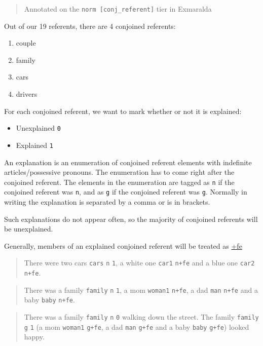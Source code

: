\documentclass[
]{book}
\providecommand{\tightlist}{%
  \setlength{\itemsep}{0pt}\setlength{\parskip}{0pt}}
\begin{document}
\begin{quote}
Annotated on the \texttt{norm\ {[}conj\_referent{]}} tier in Exmaralda
\end{quote}

Out of our 19 referents, there are 4 conjoined referents:

\begin{enumerate}
\def\labelenumi{\arabic{enumi}.}
\tightlist
\item
  couple
\item
  family
\item
  cars
\item
  drivers
\end{enumerate}

For each conjoined referent, we want to mark whether or not it is explained:

\begin{itemize}
\tightlist
\item
  Unexplained \texttt{0}
\item
  Explained \texttt{1}
\end{itemize}

An explanation is an enumeration of conjoined referent elements with indefinite articles/possessive pronouns.
The enumeration has to come right after the conjoined referent.
The elements in the enumeration are tagged as \texttt{n} if the conjoined referent was \texttt{n}, and as \texttt{g} if the conjoined referent was \texttt{g}.
Normally in writing the explanation is separated by a comma or is in brackets.

Such explanations do not appear often, so the majority of conjoined referents will be unexplained.

Generally, members of an explained conjoined referent will be treated as \protect\hyperlink{further-explanation}{+fe}

\begin{quote}
There were two cars \texttt{cars} \texttt{n} \texttt{1}, a white one \texttt{car1} \texttt{n+fe} and a blue one \texttt{car2} \texttt{n+fe}.
\end{quote}

\begin{quote}
There was a family \texttt{family} \texttt{n} \texttt{1}, a mom \texttt{woman1} \texttt{n+fe}, a dad \texttt{man} \texttt{n+fe} and a baby \texttt{baby} \texttt{n+fe}.
\end{quote}

\begin{quote}
There was a family \texttt{family} \texttt{n} \texttt{0} walking down the street. The family \texttt{family} \texttt{g} \texttt{1} (a mom \texttt{woman1} \texttt{g+fe}, a dad \texttt{man} \texttt{g+fe} and a baby \texttt{baby} \texttt{g+fe}) looked happy.
\end{quote}
\end{document}
